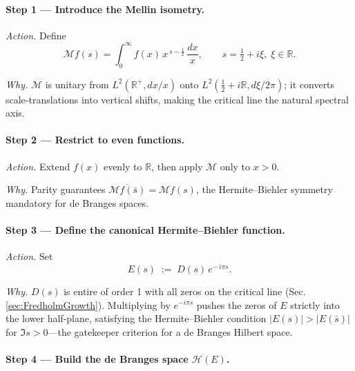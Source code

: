 \documentclass[11pt]{article}
\begin{document}
\vspace{0.6em}
\paragraph{Step 1 — Introduce the Mellin isometry.}

\emph{Action.}  
Define  
\[
   \mathcal M f(s)
   =\int_{0}^{\infty} f(x)\,x^{\,s-\frac12}\,\frac{dx}{x},
   \qquad
   s=\tfrac12+i\xi,\; \xi\in\mathbb R.
\]

\emph{Why.}  
$\mathcal M$ is unitary from $L^{2}(\mathbb R^{+},dx/x)$ onto
\(L^{2}(\tfrac12+i\mathbb R, d\xi/2\pi)\);  
it converts scale-translations into vertical shifts, making the
critical line the natural spectral axis.

\vspace{0.4em}
\paragraph{Step 2 — Restrict to even functions.}

\emph{Action.}  
Extend $f(x)$ evenly to $\mathbb R$, then apply $\mathcal M$ only to
$x>0$.

\emph{Why.}  
Parity guarantees $\overline{\mathcal M f(\bar s)}=\mathcal M f(s)$,
the Hermite–Biehler symmetry mandatory for de Branges spaces.

\vspace{0.4em}
\paragraph{Step 3 — Define the canonical Hermite–Biehler function.}

\emph{Action.}  
Set  
\[
   E(s)\;:=\;D(s)\,e^{-\,i\pi s}.
\]

\emph{Why.}  
$D(s)$ is entire of order 1 with all zeros on the critical line
(Sec.\,\ref{sec:FredholmGrowth}).  
Multiplying by $e^{-i\pi s}$ pushes the zeros of $E$ strictly into the
lower half-plane, satisfying the Hermite–Biehler condition  
\(|E(s)|>|E(\bar s)|\) for $\Im s>0$—the gatekeeper
criterion for a de Branges Hilbert space.

\vspace{0.4em}
\paragraph{Step 4 — Build the de Branges space \(\mathcal H(E)\).}
\end{document}

